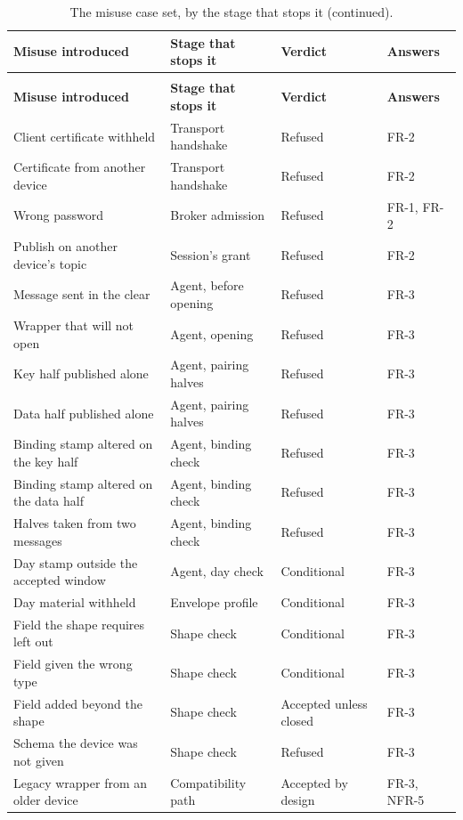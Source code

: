 \documentclass[12pt,a4paper]{report}
\begin{document}
\begin{longtable}{@{}p{5.2cm}p{3.0cm}p{3.2cm}p{2.6cm}@{}}
\caption{The misuse case set, by the stage that stops it.}
\label{tab:eval-cases}\\
\toprule
\textbf{Misuse introduced} & \textbf{Stage that stops it} &
\textbf{Verdict} & \textbf{Answers} \\
\midrule
\endfirsthead
\caption[]{The misuse case set, by the stage that stops it
(continued).}\\
\toprule
\textbf{Misuse introduced} & \textbf{Stage that stops it} &
\textbf{Verdict} & \textbf{Answers} \\
\midrule
\endhead
\bottomrule
\endlastfoot
Client certificate withheld & Transport handshake & Refused & FR-2 \\
\addlinespace
Certificate from another device & Transport handshake & Refused & FR-2 \\
\addlinespace
Wrong password & Broker admission & Refused & FR-1, FR-2 \\
\addlinespace
Publish on another device's topic & Session's grant & Refused & FR-2 \\
\addlinespace
Message sent in the clear & Agent, before opening & Refused & FR-3 \\
\addlinespace
Wrapper that will not open & Agent, opening & Refused & FR-3 \\
\addlinespace
Key half published alone & Agent, pairing halves & Refused & FR-3 \\
\addlinespace
Data half published alone & Agent, pairing halves & Refused & FR-3 \\
\addlinespace
Binding stamp altered on the key half & Agent, binding check & Refused & FR-3 \\
\addlinespace
Binding stamp altered on the data half & Agent, binding check & Refused & FR-3 \\
\addlinespace
Halves taken from two messages & Agent, binding check & Refused & FR-3 \\
\addlinespace
Day stamp outside the accepted window & Agent, day check & Conditional & FR-3 \\
\addlinespace
Day material withheld & Envelope profile & Conditional & FR-3 \\
\addlinespace
Field the shape requires left out & Shape check & Conditional & FR-3 \\
\addlinespace
Field given the wrong type & Shape check & Conditional & FR-3 \\
\addlinespace
Field added beyond the shape & Shape check & Accepted unless closed & FR-3 \\
\addlinespace
Schema the device was not given & Shape check & Refused & FR-3 \\
\addlinespace
Legacy wrapper from an older device & Compatibility path & Accepted by design & FR-3, NFR-5 \\
\end{longtable}
\end{document}
